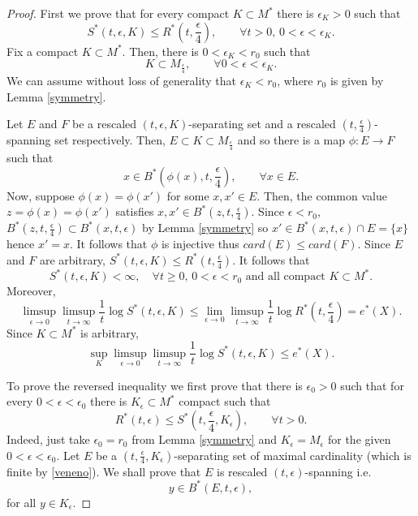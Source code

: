 \documentclass{amsart}
\numberwithin{equation}{section}
\begin{document}
\begin{proof}
First we prove that for every compact $K\subset M^*$ there is
$\epsilon_K>0$ such that
$$
S^*(t,\epsilon,K)\leq R^*(t,\frac{\epsilon}4),\quad\quad\forall t>0,\, 0<\epsilon<\epsilon_K.
$$
Fix a compact $K\subset M^*$.
Then, there is $0<\epsilon_K<r_0$ such that
$$
K\subset M_{\frac{\epsilon}4},\quad\quad\forall 0<\epsilon <\epsilon_K.
$$
We can assume without loss of generality that $\epsilon_K<r_0$, where
$r_0$ is given by Lemma \ref{symmetry}.

Let $E$ and $F$ be a rescaled $(t,\epsilon,K)$-separating set and a rescaled $(t,\frac{\epsilon}4)$-spanning set respectively.
Then, $E\subset K\subset M_{\frac{\epsilon}4}$ and so there is a map $\phi:E\to F$ such that
$$
x\in B^*(\phi(x),t,\frac{\epsilon}4),\quad\quad\forall x\in E.
$$
Now, suppose $\phi(x)=\phi(x')$ for some $x,x'\in E$.
Then, the common value $z=\phi(x)=\phi(x')$ satisfies
$x,x'\in B^*(z,t,\frac{\epsilon}4)$. Since $\epsilon<r_0$,
$B^*(z,t,\frac{\epsilon}4)\subset B^*(x,t,\epsilon)$ by Lemma \ref{symmetry}
so $x'\in B^*(x,t,\epsilon)\cap E=\{x\}$ hence $x'=x$.
It follows that $\phi$ is injective thus $card(E)\leq card(F)$. Since $E$ and $F$ are arbitrary, $S^*(t,\epsilon,K)\leq R^*(t,\frac{\epsilon}4)$. It follows that
\begin{equation}
\label{veneno}
S^*(t,\epsilon,K)<\infty,\quad\forall t\geq0,\, 0<\epsilon< r_0\mbox{ and all compact }K\subset M^*.
\end{equation}
Moreover,
$$
\limsup_{\epsilon\to0}\limsup_{t\to\infty}\frac{1}t\log S^*(t,\epsilon,K)\leq \lim_{\epsilon\to0}\limsup_{t\to\infty}\frac{1}t\log R^*(t,\frac{\epsilon}4)=e^*(X).
$$
Since $K\subset M^*$ is arbitrary,
$$
\sup_K\limsup_{\epsilon\to0}\limsup_{t\to\infty}\frac{1}t\log S^*(t,\epsilon,K)\leq e^*(X).
$$

To prove the reversed inequality we first prove that there is $\epsilon_0>0$ such that
for every $0<\epsilon<\epsilon_0$ there is $K_\epsilon\subset M^*$ compact such that
\begin{equation}
\label{metro}
 R^*(t,\epsilon)\leq S^*(t,\frac{\epsilon}4,K_\epsilon),\quad\quad\forall t>0.
\end{equation}
Indeed, just take $\epsilon_0=r_0$ from Lemma \ref{symmetry} and $K_\epsilon=M_\epsilon$ for the given $0<\epsilon<\epsilon_0$.
Let $E$ be a $(t,\frac{\epsilon}4,K_\epsilon)$-separating set of maximal cardinality (which is finite by \eqref{veneno}). We shall prove that $E$ is rescaled $(t,\epsilon)$-spanning i.e.
\begin{equation}
\label{rumble}
y\in B^*(E,t,\epsilon),
\end{equation}
for all $y\in K_\epsilon$.


\end{proof}
\end{document}
